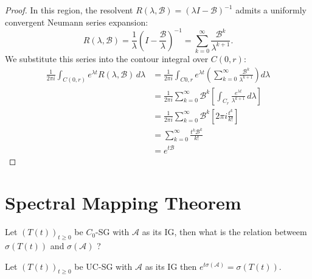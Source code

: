 \documentclass[12pt, oneside]{book}
\newcommand{\norm}[1]{\left\lVert#1\right\rVert}
\newcommand{\A}{\mathscr{A}}
\newcommand{\B}{\mathscr{B}}
\begin{document}
\begin{proof}
In this region, the resolvent $R(\lambda, \B) = (\lambda I - \B)^{-1}$ admits a uniformly convergent Neumann series expansion:
$$
R(\lambda, \B) = \frac{1}{\lambda} \left( I - \frac{\B}{\lambda} \right)^{-1} = \sum_{k=0}^\infty \frac{\B^k}{\lambda^{k+1}}.
$$
We substitute this series into the contour integral over $C(0, r)$:
\begin{align*}
\frac{1}{2\pi i} \int_{C(0,r)} e^{\lambda t} R(\lambda,\B) \, d\lambda 
&= \frac{1}{2\pi i} \int_{C{0,r}} e^{\lambda t} \left( \sum_{k=0}^\infty \frac{\B^k}{\lambda^{k+1}} \right) d\lambda \\
&= \frac{1}{2\pi i} \sum_{k=0}^\infty \B^k \left[ \int_{C_r} \frac{e^{\lambda t}}{\lambda^{k+1}} \, d\lambda \right] \\
&= \frac{1}{2\pi i} \sum_{k=0}^\infty \B^k \left[2\pi i \frac{t^k}{k!} \right] \\
&= \sum_{k=0}^\infty \frac{t^k \B^k}{k!} \\
&= e^{t\B}
\end{align*}
\end{proof}

\section{Spectral Mapping Theorem}
Let $\left( T(t) \right)_{t \ge 0}$ be $C_0$-SG with $\A$ as its IG, then what is the relation betweem $\sigma(T(t))$ and $\sigma(\A)$ ?

\begin{exercise}{}{}
	Let $\left( T(t) \right)_{t \ge 0}$ be UC-SG with $\A$ as its IG then $e^{t\sigma(\A)} = \sigma(T(t))$.
\end{exercise}

\end{document}

